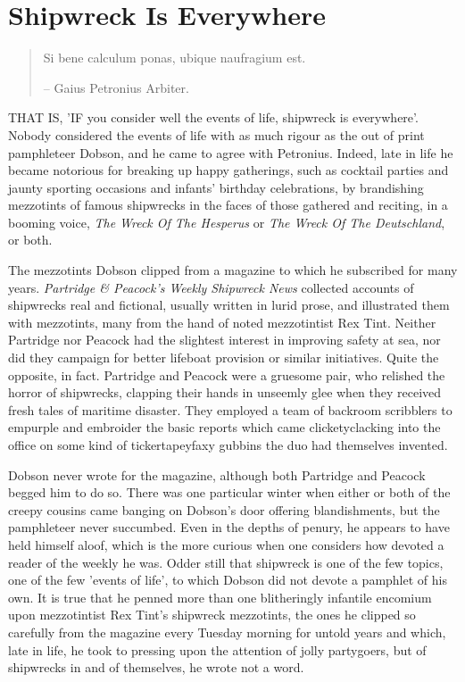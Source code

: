 \chapter{Shipwreck Is Everywhere}

\begin{quotation}Si bene calculum ponas, ubique naufragium est.

-- Gaius Petronius Arbiter. 
\end{quotation}

THAT IS, 'IF you consider well the events of life, shipwreck is everywhere'. Nobody considered the events of life with as much rigour as the out of print pamphleteer Dobson, and he came to agree with Petronius. Indeed, late in life he became notorious for breaking up happy gatherings, such as cocktail parties and jaunty sporting occasions and infants' birthday celebrations, by brandishing mezzotints of famous shipwrecks in the faces of those gathered and reciting, in a booming voice, \emph{The Wreck Of The Hesperus} or \emph{The Wreck Of The Deutschland}, or both.

The mezzotints Dobson clipped from a magazine to which he subscribed for many years. \emph{Partridge \& Peacock's Weekly Shipwreck News} collected accounts of shipwrecks real and fictional, usually written in lurid prose, and illustrated them with mezzotints, many from the hand of noted mezzotintist Rex Tint. Neither Partridge nor Peacock had the slightest interest in improving safety at sea, nor did they campaign for better lifeboat provision or similar initiatives. Quite the opposite, in fact. Partridge and Peacock were a gruesome pair, who relished the horror of shipwrecks, clapping their hands in unseemly glee when they received fresh tales of maritime disaster. They employed a team of backroom scribblers to empurple and embroider the basic reports which came clicketyclacking into the office on some kind of tickertapeyfaxy gubbins the duo had themselves invented.

Dobson never wrote for the magazine, although both Partridge and Peacock begged him to do so. There was one particular winter when either or both of the creepy cousins came banging on Dobson's door offering blandishments, but the pamphleteer never succumbed. Even in the depths of penury, he appears to have held himself aloof, which is the more curious when one considers how devoted a reader of the weekly he was. Odder still that shipwreck is one of the few topics, one of the few 'events of life', to which Dobson did not devote a pamphlet of his own. It is true that he penned more than one blitheringly infantile encomium upon mezzotintist Rex Tint's shipwreck mezzotints, the ones he clipped so carefully from the magazine every Tuesday morning for untold years and which, late in life, he took to pressing upon the attention of jolly partygoers, but of shipwrecks in and of themselves, he wrote not a word.

